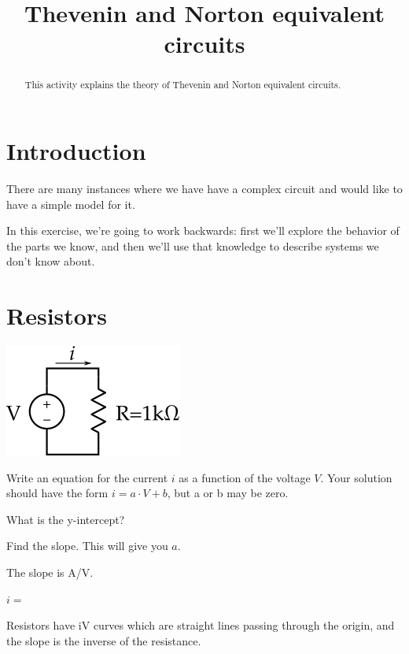 \documentclass{ximera}
\title{Thevenin and Norton equivalent circuits}
\begin{document}
\begin{abstract}
This activity explains the theory of Thevenin and Norton equivalent circuits.
\end{abstract}

\maketitle

\section{Introduction}
There are many instances where we have have a complex circuit and would like to have a simple model for it.

In this exercise, we're going to work backwards: first we'll explore the behavior of the parts we know, and then we'll use that knowledge to describe systems we don't know about.

\section{Resistors}

\begin{exercise}
\includegraphics{figures/single_resistor.png}

Write an equation for the current $i$ as a function of the voltage $V$.  Your solution should have the form $i = a \cdot V + b$, but a or b may be zero.

\begin{solution}
  \begin{hint}
    \begin{prompt}
      What is the y-intercept? 
    \end{prompt}
  \end{hint}
  \begin{hint}
    Find the slope.  This will give you $a$.
    \begin{prompt}
      The slope is  A/V.
    \end{prompt}
  \end{hint}
  
  $i = $ 
\end{solution}

Resistors have iV curves which are straight lines passing through the origin, and the slope is the inverse of the resistance.
\end{exercise}
\end{document}

